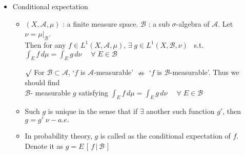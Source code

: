 \documentclass[12pt]{article}
\newcommand{\rmk}{$\surd$}
\newcommand{\A}{\mathcal{A}}
\newcommand{\B}{\mathcal{B}}
\newcommand{\exist}{\exists \;}
\newcommand{\forany}{\; \forall \;}
\begin{document}
\begin{itemize}
    \item Conditional expectation
    \begin{itemize}
        \item $(X, \A, \mu)$ : a finite measure space. $\B$ : a sub $\sigma$-algebra of $\A$. Let $\nu=\mu|_\B$. \\Then for any $f\in L^1(X, \A, \mu)$, \;$\exist g\in L^1(X, \B, \nu)$ \, s.t. $\int_E f\, d\mu=\int_E g\, d\nu \quad \forany E\in \B$ 
        \item[\rmk] For $\B\subset \A$, \;`$f$ is $\A$-measurable' $\nRightarrow$ `$f$ is $\B$-measurable'. Thus we should find \\$\B$- measurable $g$ satisfying $\int_E f\, d\mu=\int_E g\, d\nu \quad \forany E\in \B$
        \item Such $g$ is unique in the sense that if $\exists$ another such function $g'$, then $g=g'\; \nu-a.e.$ 
        \item In probability theory, $g$ is called as the conditional expectation of $f$. \\ Denote it as $g=E\,[\,f\,|\,\B\,]$
    \end{itemize}
\end{itemize}
\end{document}
